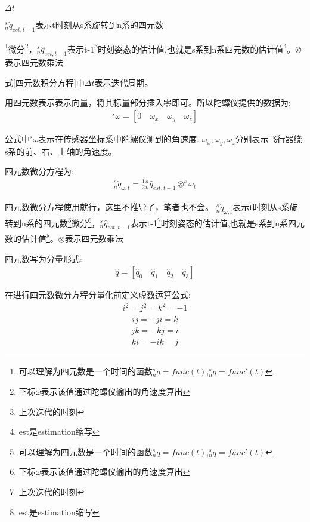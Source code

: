 $\Delta t$

$^s_n\dot{q}_{est,t-1}$表示t时刻从s系旋转到n系的四元数

\footnote{可以理解为四元数是一个时间的函数$^s_n{q}=func(t)$,$^s_n\dot{q}=func'(t)$}微分\footnote{下标$\omega$表示该值通过陀螺仪输出的角速度算出}，${^s_n\hat{q}_{est,t-1}}$表示t-1\footnote{上次迭代的时刻}时刻姿态的估计值,也就是s系到n系四元数的估计值\footnote{est是estimation缩写}。$\otimes$表示四元数乘法

式\ref{四元数积分方程}中$\Delta t$表示迭代周期。

用四元数表示表示向量，将其标量部分插入零即可。所以陀螺仪提供的数据为:
\begin{eqnarray}
    ^s\omega=[0\quad\omega_{x}\quad\omega_{y}\quad\omega_{z}] \label{陀螺仪数据}
\end{eqnarray}

公式中$^s\omega$表示在传感器坐标系中陀螺仪测到的角速度.
$\omega_{x},\omega_{y},\omega_{z}$分别表示飞行器绕s系的前、右、上轴的角速度。

四元数微分方程为:
\begin{eqnarray}
    ^s_n\dot{q}_{\omega,t}=\frac{1}{2}{^s_n\hat{q}_{est,t-1}}\otimes^s\omega_t \label{四元数微分方程}
\end{eqnarray}

四元数微分方程使用就行，这里不推导了，笔者也不会。
$^s_n\dot{q}_{\omega,t}$表示t时刻从s系旋转到n系的四元数\footnote{可以理解为四元数是一个时间的函数$^s_n{q}=func(t)$,$^s_n\dot{q}=func'(t)$}微分\footnote{下标$\omega$表示该值通过陀螺仪输出的角速度算出}，${^s_n\hat{q}_{est,t-1}}$表示t-1\footnote{上次迭代的时刻}时刻姿态的估计值,也就是s系到n系四元数的估计值\footnote{est是estimation缩写}。$\otimes$表示四元数乘法

四元数写为分量形式:
\begin{eqnarray}
    \hat{q}=[\hat{q}_0\quad \hat{q}_1\quad \hat{q}_2\quad \hat{q}_3] \label{分量四元数}
\end{eqnarray}

在进行四元数微分方程分量化前定义虚数运算公式:
\begin{eqnarray}
    i^2 = j^2 = k^2 = -1
\end{eqnarray}
\begin{eqnarray}
    ij = -ji = k
\end{eqnarray}
\begin{eqnarray}
    jk = -kj = i
\end{eqnarray}
\begin{eqnarray}
    ki = -ik = j
\end{eqnarray}

